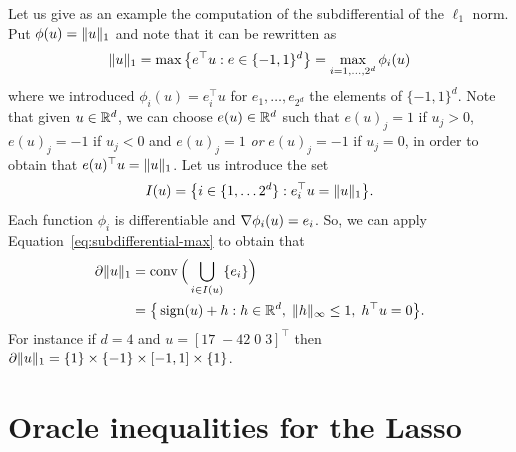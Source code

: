 Let us give as an example the computation of the subdifferential of the $\ell_1$ norm.
Put $\phi(u) = \| u \|_1$ and note that it can be rewritten as
\begin{equation*}
	\| u \|_1 = \max \big\{ e^\top u : e \in \{ -1, 1 \}^d \big\} = \max_{i=1, \ldots, 2^d} \phi_i(u)
\end{equation*}
where we introduced $\phi_i(u) = e_i^\top u$ for $e_1, \ldots, e_{2^d}$ the elements of $\{ -1, 1 \}^d$.
Note that given $u \in \mathbb R^d$, we can choose $e(u) \in \mathbb R^d$ such that $e(u)_j = 1$ if $u_j > 0$, $e(u)_j = -1$ if $u_j < 0$ and $e(u)_j = 1$ \emph{or} $e(u)_j = -1$ if $u_j = 0$, in order to obtain that $e(u)^\top u = \| u \|_1$.
Let us introduce the set
\begin{equation*}
	I(u) = \big\{ i \in \{ 1, \ldots 2^d \} : e_i^\top u = \| u \|_1 \big\}.
\end{equation*}
Each function $\phi_i$ is differentiable and $\nabla \phi_i(u) = e_i$. 
So, we can apply Equation~\eqref{eq:subdifferential-max} to obtain that
\begin{equation}
	\label{eq:subdifferential-l1}
	\begin{split}
	\partial \| u \|_1 &= \operatorname{conv}\Big( \bigcup_{i \in I(u)} \{ e_i \} \Big) \\
	&= \big\{ \operatorname{sign}(u) + h : h \in \mathbb R^d, \; \| h \|_\infty \leq 1, \; h^\top u = 0 
	\big\}.
	\end{split}
\end{equation}
For instance if $d = 4$ and $u = [17 \; -42 \; 0 \; 3]^\top$ then $\partial \| u \|_1 = \{ 1 \} \times \{ -1 \} \times [-1, 1] \times \{ 1 \}$.

\section{Oracle inequalities for the Lasso} %

